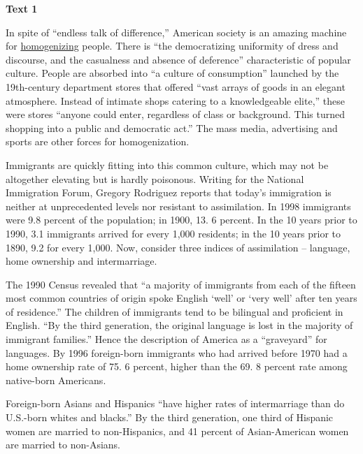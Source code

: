 
\begin{center}\textbf{Text 1}\end{center}

\qquad In spite of ``endless talk of difference,'' American society is an amazing machine for \ul{homogenizing} people. There is ``the democratizing uniformity of dress and discourse, and the casualness and absence of deference'' characteristic of popular culture. People are absorbed into ``a culture of consumption'' launched by the 19th-century department stores that offered ``vast arrays of goods in an elegant atmosphere. Instead of intimate shops catering to a knowledgeable elite,'' these were stores ``anyone could enter, regardless of class or background. This turned shopping into a public and democratic act.'' The mass media, advertising and sports are other forces for homogenization.

\qquad Immigrants are quickly fitting into this common culture, which may not be altogether elevating but is hardly poisonous. Writing for the National Immigration Forum, Gregory Rodriguez reports that today's immigration is neither at unprecedented levels nor resistant to assimilation. In 1998 immigrants were 9.8 percent of the population; in 1900, 13. 6 percent. In the 10 years prior to 1990, 3.1 immigrants arrived for every 1,000 residents; in the 10 years prior to 1890, 9.2 for every 1,000.  Now, consider three indices of assimilation -- language, home ownership and intermarriage.

\qquad The 1990 Census revealed that ``a majority of immigrants from each of the fifteen most common countries of origin spoke English `well' or `very well' after ten years of residence.'' The children of immigrants tend to be bilingual and proficient in English. ``By the third generation, the original language is lost in the majority of immigrant families.'' Hence the description of America as a ``graveyard'' for languages. By 1996 foreign-born immigrants who had arrived before 1970 had a home ownership rate of 75. 6 percent, higher than the 69. 8 percent rate among native-born Americans.

\qquad Foreign-born Asians and Hispanics ``have higher rates of intermarriage than do U.S.-born whites and blacks.'' By the third generation, one third of Hispanic women are married to non-Hispanics, and 41 percent of Asian-American women are married to non-Asians.

